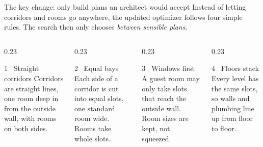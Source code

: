 \documentclass[9pt,aspectratio=169]{beamer}
\begin{document}
\begin{frame}{The key change: only build plans an architect would accept}
Instead of letting corridors and rooms go anywhere, the updated optimizer follows four simple rules. The search then only chooses \emph{between sensible plans}.
\vspace{0.2cm}
\begin{columns}[T]
\begin{column}{0.23\textwidth}
\begin{block}{1 \ Straight corridors}
Corridors are straight lines, one room deep in from the outside wall, with rooms on both sides.
\end{block}
\end{column}
\begin{column}{0.23\textwidth}
\begin{block}{2 \ Equal bays}
Each side of a corridor is cut into equal slots, one standard room wide. Rooms take whole slots.
\end{block}
\end{column}
\begin{column}{0.23\textwidth}
\begin{block}{3 \ Windows first}
A guest room may only take slots that reach the outside wall. Room sizes are kept, not squeezed.
\end{block}
\end{column}
\begin{column}{0.23\textwidth}
\begin{block}{4 \ Floors stack}
Every level has the same slots, so walls and plumbing line up from floor to floor.
\end{block}
\end{column}
\end{columns}
\vspace{0.3cm}
\end{frame}
\end{document}

